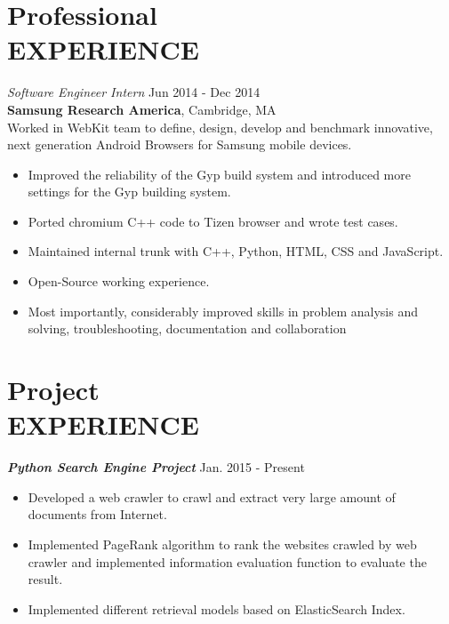 \documentclass[margin, 10pt]{res}%
\begin{document}
\begin{resume}
\section{Professional \\ EXPERIENCE}
{\sl Software Engineer Intern} \hfill  Jun 2014 - Dec 2014 \\
 \textbf{Samsung Research America}, Cambridge, MA
 \\ Worked in WebKit team to define, design, develop and benchmark innovative, next generation Android Browsers for Samsung mobile devices.
\begin{itemize} \itemsep -2pt %
\item Improved the reliability of the Gyp build system and introduced more settings for the Gyp building system.
\item Ported chromium C++ code to Tizen browser and wrote test cases.
\item Maintained internal trunk with C++, Python, HTML, CSS and JavaScript.
\item Open-Source working experience.
\item Most importantly, considerably improved skills in problem analysis and solving, troubleshooting, documentation and collaboration
\end{itemize}


\section{Project \\ EXPERIENCE}

{\sl \textbf{Python Search Engine Project}} \hfill Jan. 2015 - Present
\begin{itemize}
\item Developed a web crawler to crawl and extract very large amount of documents from Internet.
\item Implemented PageRank algorithm to rank the websites crawled by web crawler and implemented information evaluation function to evaluate the result.
\item Implemented different retrieval models based on ElasticSearch Index.
\end{itemize}


\end{resume}
\end{document}
